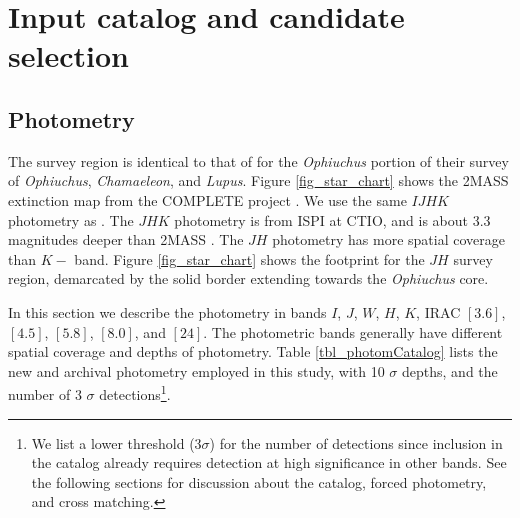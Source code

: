 \documentclass[12pt,preprint]{aastex}
\begin{document}
\section{Input catalog and candidate selection}
\subsection{Photometry}
The survey region is identical to that of \cite{allers06} for the \emph{Ophiuchus} portion of their survey of \emph{Ophiuchus}, \emph{Chamaeleon}, and \emph{Lupus}.  Figure \ref{fig_star_chart} shows the 2MASS extinction map \citep{2008A&A...489..143L} from the COMPLETE project \citep{2006AJ....131.2921R}.  We use the same $IJHK$ photometry as \citet{allers06}.  The $JHK$ photometry is from ISPI at CTIO, and is about 3.3 magnitudes deeper than 2MASS \citep{allers06}.  The $JH$ photometry has more spatial coverage than $K-$ band.  Figure \ref{fig_star_chart} shows the footprint for the $JH$ survey region, demarcated by the solid border extending towards the \emph{Ophiuchus} core.

In this section we describe the photometry in bands $I$, $J$, $W$, $H$, $K$, IRAC $[3.6]$, $[4.5]$, $[5.8]$, $[8.0]$, and $[24]$.  The photometric bands generally have different spatial coverage and depths of photometry.  Table \ref{tbl_photomCatalog} lists the new and archival photometry employed in this study, with 10 $\sigma$ depths, and the number of 3 $\sigma$ detections\footnote{We list a lower threshold (3$ \sigma$) for the number of detections since inclusion in the catalog already requires detection at high significance in other bands.  See the following sections for discussion about the catalog, forced photometry, and cross matching.}.
\end{document}
